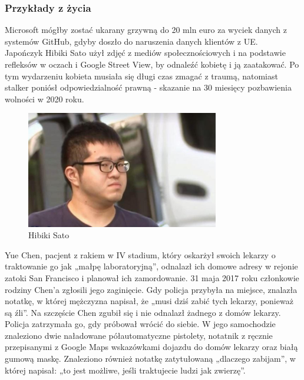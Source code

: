 \subsubsection{Przykłady z życia}
Microsoft mógłby zostać ukarany grzywną do 20 mln euro za wyciek danych z systemów GitHub, gdyby doszło do naruszenia danych klientów z UE.\\

Japończyk Hibiki Sato użył zdjęć z mediów społecznościowych i na podstawie refleksów w oczach i Google Street View, by odnaleźć kobietę i ją zaatakować. Po tym wydarzeniu kobieta musiała się długi czas zmagać z traumą, natomiast stalker poniósł odpowiedzialność prawną - skazanie na 30 miesięcy pozbawienia wolności w 2020 roku.

\begin{figure}[H]
  \centering
  \includegraphics[width=0.75\textwidth]{images/stalker.jpg}
  \caption{Hibiki Sato}
  \label{fig:stalker}
\end{figure}

Yue Chen, pacjent z rakiem w IV stadium, który oskarżył swoich lekarzy o traktowanie go jak „małpę laboratoryjną”, odnalazł ich domowe adresy w rejonie zatoki San Francisco i planował ich zamordowanie.
31 maja 2017 roku członkowie rodziny Chen'a zgłosili jego zaginięcie. Gdy policja przybyła na miejsce, znalazła notatkę, w której mężczyzna napisał, że „musi dziś zabić tych lekarzy, ponieważ są źli”.
Na szczęście Chen zgubił się i nie odnalazł żadnego z domów lekarzy. Policja zatrzymała go, gdy próbował wrócić do siebie. W jego samochodzie znaleziono dwie naładowane półautomatyczne pistolety, notatnik z ręcznie przepisanymi z Google Maps wskazówkami dojazdu do domów lekarzy oraz białą gumową maskę. Znaleziono również notatkę zatytułowaną „dlaczego zabijam”, w której napisał: „to jest możliwe, jeśli traktujecie ludzi jak zwierzę”.